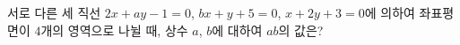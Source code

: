 서로 다른 세 직선 $2x+ay-1=0$, $bx+y+5=0$, $x+2y+3=0$에 의하여 좌표평면이 $4$개의 영역으로 나뉠 때, 상수 $a$, $b$에 대하여 $ab$의 값은?

